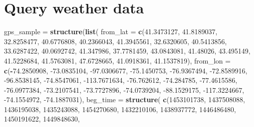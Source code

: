 \documentclass[12pt]{book}
\newenvironment{Shaded}{\begin{snugshade}}{\end{snugshade}}
\newcommand{\DataTypeTok}[1]{\textcolor[rgb]{0.13,0.29,0.53}{#1}}
\newcommand{\DecValTok}[1]{\textcolor[rgb]{0.00,0.00,0.81}{#1}}
\newcommand{\FloatTok}[1]{\textcolor[rgb]{0.00,0.00,0.81}{#1}}
\newcommand{\KeywordTok}[1]{\textcolor[rgb]{0.13,0.29,0.53}{\textbf{#1}}}
\newcommand{\NormalTok}[1]{#1}
\newcommand{\OperatorTok}[1]{\textcolor[rgb]{0.81,0.36,0.00}{\textbf{#1}}}
\newcommand{\StringTok}[1]{\textcolor[rgb]{0.31,0.60,0.02}{#1}}
\numberwithin{equation}{chapter}
\begin{document}
\hypertarget{weatherdat}{%
\section*{Query weather data}\label{weatherdat}}

\begin{Shaded}
\begin{Highlighting}[]
\NormalTok{gps_sample =}\StringTok{ }
\StringTok{  }\KeywordTok{structure}\NormalTok{(}\KeywordTok{list}\NormalTok{(}
    \DataTypeTok{from_lat =} \KeywordTok{c}\NormalTok{(}\FloatTok{41.3473127}\NormalTok{, }\FloatTok{41.8189037}\NormalTok{, }\FloatTok{32.8258477}\NormalTok{, }\FloatTok{40.6776808}\NormalTok{, }
                 \FloatTok{40.2366043}\NormalTok{, }\FloatTok{41.3945561}\NormalTok{, }\FloatTok{32.6320605}\NormalTok{, }\FloatTok{40.5413856}\NormalTok{, }
                 \FloatTok{33.6287422}\NormalTok{, }\FloatTok{40.0692742}\NormalTok{, }\FloatTok{41.347986}\NormalTok{, }\FloatTok{37.7781459}\NormalTok{, }
                 \FloatTok{43.0843081}\NormalTok{, }\FloatTok{41.48026}\NormalTok{, }\FloatTok{43.495149}\NormalTok{, }\FloatTok{41.5228684}\NormalTok{, }
                 \FloatTok{41.5763081}\NormalTok{, }\FloatTok{47.6728665}\NormalTok{, }\FloatTok{41.0918361}\NormalTok{, }\FloatTok{41.1537819}\NormalTok{),}
    \DataTypeTok{from_lon =} \KeywordTok{c}\NormalTok{(}\OperatorTok{-}\FloatTok{74.2850908}\NormalTok{, }\FloatTok{-73.0835104}\NormalTok{, }\FloatTok{-97.0306677}\NormalTok{, }\FloatTok{-75.1450753}\NormalTok{,}
                 \FloatTok{-76.9367494}\NormalTok{, }\FloatTok{-72.8589916}\NormalTok{, }\FloatTok{-96.8538145}\NormalTok{, }\FloatTok{-74.8547061}\NormalTok{, }
                 \FloatTok{-113.7671634}\NormalTok{, }\FloatTok{-76.762612}\NormalTok{, }\FloatTok{-74.284785}\NormalTok{, }\FloatTok{-77.4615586}\NormalTok{, }
                 \FloatTok{-76.0977384}\NormalTok{, }\FloatTok{-73.2107541}\NormalTok{, }\FloatTok{-73.7727896}\NormalTok{, }\FloatTok{-74.0739204}\NormalTok{, }
                 \FloatTok{-88.1529175}\NormalTok{, }\FloatTok{-117.3224667}\NormalTok{, }\FloatTok{-74.1554972}\NormalTok{, }\FloatTok{-74.1887031}\NormalTok{), }
    \DataTypeTok{beg_time =} \KeywordTok{structure}\NormalTok{(}
      \KeywordTok{c}\NormalTok{(}\DecValTok{1453101738}\NormalTok{, }\DecValTok{1437508088}\NormalTok{, }\DecValTok{1436195038}\NormalTok{, }\DecValTok{1435243088}\NormalTok{, }\DecValTok{1454270680}\NormalTok{, }
        \DecValTok{1432210106}\NormalTok{, }\DecValTok{1438937772}\NormalTok{, }\DecValTok{1446486480}\NormalTok{, }\DecValTok{1450191622}\NormalTok{, }\DecValTok{1449848630}\NormalTok{, }

\end{Highlighting}
\end{Shaded}
\end{document}
